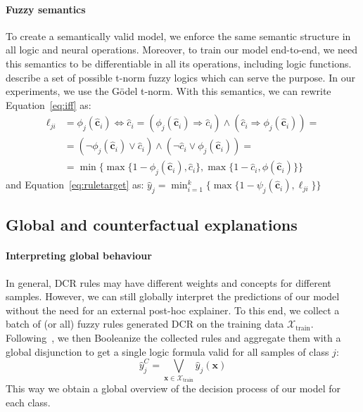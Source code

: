 \paragraph{Fuzzy semantics}
\label{sec:semirings}
To create a semantically valid model, we enforce the same semantic structure in all logic and neural operations. 
Moreover, to train our model end-to-end, we need this semantics to be differentiable in all its operations, including logic functions. \citet{marra2020lyrics} describe a set of possible t-norm fuzzy logics which can serve the purpose. In our experiments, we use the G\"odel t-norm. With this semantics, we can rewrite Equation~\ref{eq:iff} as:
\[
\begin{array}{ll}
    \ell_{ji} & =\phi_j(\hat{\mathbf{c}}_i)\Leftrightarrow \hat{c}_i =  (\phi_j(\hat{\mathbf{c}}_i)\Rightarrow \hat{c}_i)\wedge (\hat{c}_i\Rightarrow \phi_j(\hat{\mathbf{c}}_i)) = \nonumber\\   
    &=(\neg\phi_j(\hat{\mathbf{c}}_i)\vee \hat{c}_i)\wedge (\neg \hat{c}_i\vee \phi_j(\hat{\mathbf{c}}_i)) = \nonumber\\   
    &=\min\{\max\{1-\phi_j(\hat{\mathbf{c}}_i), \hat{c}_{i}\}, \max\{1-\hat{c}_{i},\phi(\hat{\mathbf{c}}_i)\}\}
\end{array}
\]
and Equation~\ref{eq:ruletarget} as: $
    \hat{y}_j = \min_{i=1}^k\{\max\{1 - \psi_j(\hat{\mathbf{c}}_i), \ell_{ji}\}\}
$

\subsection{Global and counterfactual explanations}
\label{sec:ruleadv}

\paragraph{Interpreting global behaviour}
In general, DCR rules may have different weights and concepts for different samples. However, we can still globally interpret the predictions of our model without the need for an external post-hoc explainer. To this end, we collect a batch of (or all) fuzzy rules generated DCR on the training data $\mathcal{X}_{\text{train}}$. Following~\citet{barbiero2022entropy}, we then Booleanize the collected rules and aggregate them with a global disjunction to get a single logic formula valid for all samples of class $j$:
\begin{equation} \label{eq:global-explanation}
    \hat{y}^C_j = \bigvee_{\mathbf{x} \in \mathcal{X}_{\text{train}}} \hat{y}_j(\mathbf{x})
\end{equation}
This way we obtain a global overview of the decision process of our model for each class.

